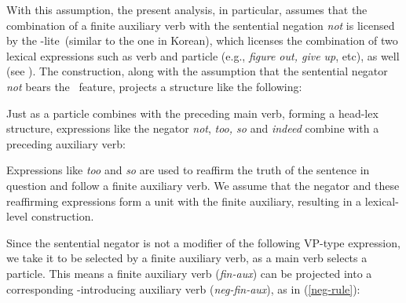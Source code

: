 \documentclass[output=paper]{langsci/langscibook}
\begin{document}
 With this assumption, the
present analysis, in particular, assumes that
the combination of a finite auxiliary verb with the sentential
negation {\it not} is licensed by the \hd-lite\ (similar to the one
in Korean), which licenses
the combination of two lexical expressions such as verb and particle (e.g., {\it figure out, give up}, etc), as well (see \citet{KM}). The construction, along with the assumption that the sentential negator {\it not}
bears the \LEX\ feature, projects a structure like the following:

\be
\ex {}
\ee

%
Just as a particle combines with the preceding main verb, forming a
head-lex structure,  expressions like
the negator {\it not}, {\it too, so} and {\it indeed} combine with a
preceding auxiliary verb:

\be
\ex \begin{xlist}
\end{xlist}
\ee
%
Expressions like {\it too} and {\it so} are used to
reaffirm the truth of the sentence in question and
follow a finite auxiliary verb.  We assume that the negator and these reaffirming expressions form
a unit with the finite auxiliary, resulting in a lexical-level construction.

Since the sentential negator is not a modifier of
the following VP-type expression,
we take it to be selected by a finite auxiliary verb, as a main verb selects a particle.
This means a finite auxiliary verb ({\it fin-aux}) can be projected into a corresponding
\NEG-introducing auxiliary verb ({\it neg-fin-aux}), as in (\ref{neg-rule}):
%
\end{document}
